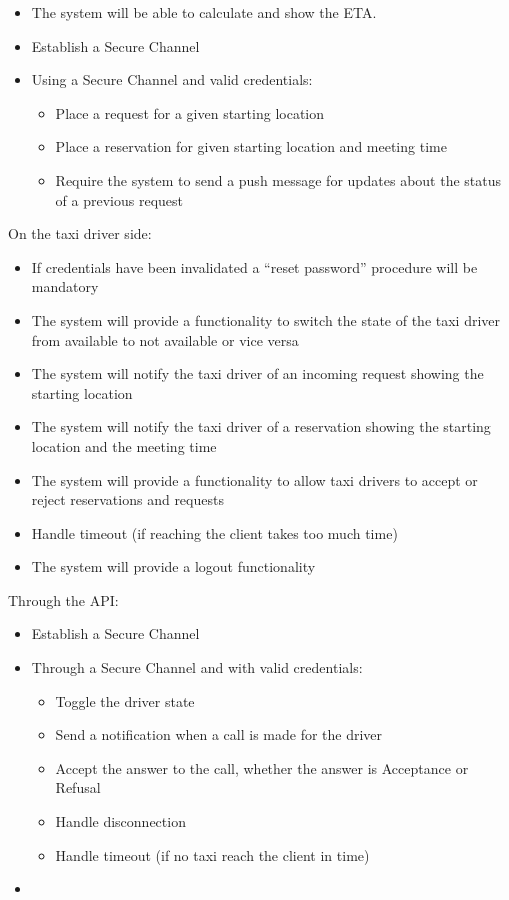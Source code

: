 \documentclass{article}
\begin{document}
\begin{itemize}
\begin{itemize}
			\item The system will be able to calculate and show the ETA.\@ 
			\item Establish a Secure Channel 
			\item Using a Secure Channel and valid credentials:\@
				\begin{itemize}
					\item Place a request for a given starting location
					\item Place a reservation for given starting location and meeting time
					\item Require the system to send a push message for updates about the status of a previous request
				\end{itemize}
		\end{itemize}
\end{itemize}
On the taxi driver side:\@ 
\begin{itemize}
	\item If credentials have been invalidated a ``reset password'' procedure will be mandatory %
	\item The system will provide a functionality to switch the state of the taxi driver from available to not available or vice versa
	\item The system will notify the taxi driver of an incoming request showing the starting location
	\item The system will notify the taxi driver of a reservation showing the starting location and the meeting time
	\item The system will provide a functionality to allow taxi drivers to accept or reject reservations and requests
	\item Handle timeout (if reaching the client takes too much time) %
	\item The system will provide a logout functionality
\end{itemize}
Through the API:\@ %
\begin{itemize}
	\item Establish a Secure Channel
	\item Through a Secure Channel and with valid credentials:\@
		\begin{itemize}
			\item Toggle the driver state
			\item Send a notification when a call is made for the driver
			\item Accept the answer to the call, whether the answer is Acceptance or Refusal
			\item Handle disconnection
			\item Handle timeout (if no taxi reach the client in time)
		\end{itemize}
	\item 
\end{itemize}
\end{document}
